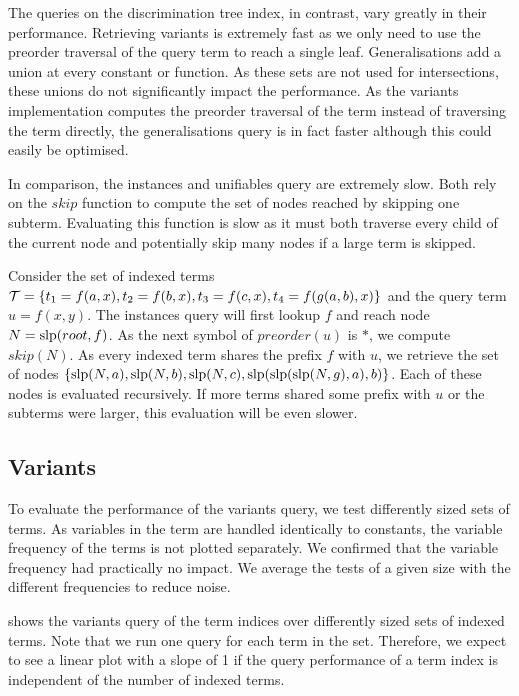 The queries on the discrimination tree index, in contrast, vary greatly in their performance.
Retrieving variants is extremely fast as we only need to use the preorder traversal of the query term to reach a single leaf. Generalisations add a union at every constant or function. As these sets are not used for intersections, these unions do not significantly impact the performance. As the variants implementation computes the preorder traversal of the term instead of traversing the term directly, the generalisations query is in fact faster although this could easily be optimised.

In comparison, the instances and unifiables query are extremely slow.
Both rely on the $skip$ function to compute the set of nodes reached by skipping one subterm.
Evaluating this function is slow as it must both traverse every child of the current node and potentially skip many nodes if a large term is skipped.

\begin{exmpl}
  Consider the set of indexed terms $\mathcal{T} = \{t_{1} = f(a,x), t_{2} = f(b,x), t_{3} = f(c,x), t_{4} = f(g(a,b),x)\}$ and the query term $u = f(x,y)$.
  The instances query will first lookup $f$ and reach node $N = \mathrm{slp}(root,f)$. As the next symbol of $preorder(u)$ is $*$, we compute $skip(N)$. As every indexed term shares the prefix $f$ with $u$, we retrieve the set of nodes $\{\mathrm{slp}(N,a), \mathrm{slp}(N,b), \mathrm{slp}(N,c), \mathrm{slp}(\mathrm{slp}(\mathrm{slp}(N,g),a),b)\}$. Each of these nodes is evaluated recursively.
  If more terms shared some prefix with $u$ or the subterms were larger, this evaluation will be even slower.
\end{exmpl}

\subsection{Variants}
To evaluate the performance of the variants query, we test differently sized sets of terms. As variables in the term are handled identically to constants, the variable frequency of the terms is not plotted separately. We confirmed that the variable frequency had practically no impact. We average the tests of a given size with the different frequencies to reduce noise.

 shows the variants query of the term indices over differently sized sets of indexed terms. Note that we run one query for each term in the set. Therefore, we expect to see a linear plot with a slope of 1 if the query performance of a term index is independent of the number of indexed terms.

